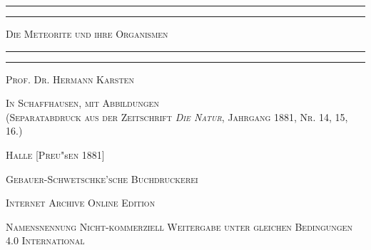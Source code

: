 \documentclass[a4paper, 11pt, oneside]{article}
\begin{document}
\begin{titlepage} %
	\centering %

	
	\rule{\textwidth}{1.6pt}\vspace*{-\baselineskip}\vspace*{2pt} %
	\rule{\textwidth}{0.4pt} %
	
	\vspace{1.5\baselineskip} %
	
	{\scshape\LARGE Die Meteorite und ihre Organismen}
	
	\vspace{1\baselineskip} %

	\rule{\textwidth}{0.4pt}\vspace*{-\baselineskip}\vspace{3.2pt} %
	\rule{\textwidth}{1.6pt} %
	
	\vspace{1\baselineskip} %
	
	
	{\scshape Prof. Dr. Hermann Karsten} %
	
	\vspace*{1\baselineskip} %
	
    {\scshape\small In Schaffhausen, mit Abbildungen\\ (Separatabdruck aus der Zeitschrift \emph{Die Natur}, Jahrgang 1881, Nr. 14, 15, 16.)} %
    
    \vspace*{\fill}

	\vspace{1\baselineskip}

	{\small\scshape Halle [Preu}\small "s{\small\scshape en 1881]}
	
	{\small\scshape{Gebauer-Schwetschke'sche Buchdruckerei}}
	
	\vspace{0.5\baselineskip} %

    \scshape Internet Archive Online Edition  %
	
	{\scshape\small Namensnennung Nicht-kommerziell Weitergabe unter gleichen Bedingungen 4.0 International} %
\end{titlepage}
\setlength{\parskip}{1mm plus1mm minus1mm}
\clearpage
\tableofcontents
\clearpage
\end{document}
